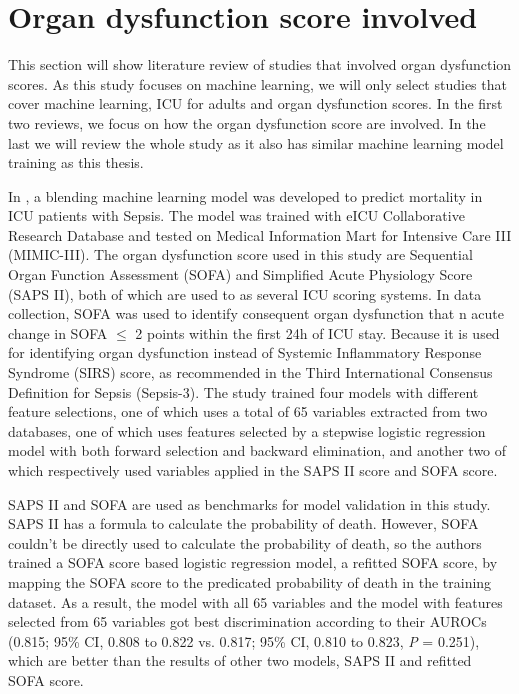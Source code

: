 \documentclass[12pt,a4paper,english
]{tunithesis}
\begin{document}
\section{Organ dysfunction score involved}
This section will show literature review of studies that involved organ dysfunction scores. As this study focuses on machine learning, we will only select studies that cover machine learning, ICU for adults and organ dysfunction scores. In the first two reviews, we focus on how the organ dysfunction score are involved. In the last we will review the whole study as it also has similar machine learning model training as this thesis.

In \textcite{zeng2021}, a blending machine learning model was developed to predict mortality in ICU patients with Sepsis. The model was trained with eICU Collaborative Research Database and tested on Medical Information Mart for Intensive Care III (MIMIC-III). The organ dysfunction score used in this study are Sequential Organ Function Assessment (SOFA) and Simplified Acute Physiology Score (SAPS II), both of which are used to as several ICU scoring systems. In data collection, SOFA was used to identify consequent organ dysfunction that n acute change in SOFA $\leq$ 2 points within the first 24h of ICU stay. Because it is used for identifying organ dysfunction instead of Systemic Inflammatory Response Syndrome (SIRS) score, as recommended in the Third International Consensus Definition for Sepsis (Sepsis-3). The study trained four models with different feature selections, one of which uses a total of 65 variables extracted from two databases, one of which uses features selected by a stepwise logistic regression model with both forward selection and backward elimination, and another two of which respectively used variables applied in the SAPS II score and SOFA score. 

SAPS II and SOFA are used as benchmarks for model validation in this study. SAPS II has a formula to calculate the probability of death. However, SOFA couldn't be directly used to calculate the probability of death, so the authors trained a SOFA score based logistic regression model, a refitted SOFA score, by mapping the SOFA score to the predicated probability of death in the training dataset. As a result, the model with all 65 variables and the model with features selected from 65 variables got best discrimination according to their AUROCs (0.815; 95\% CI, 0.808 to 0.822 vs. 0.817; 95\% CI, 0.810 to 0.823, \textit{P} = 0.251), which are better than the results of other two models, SAPS II and refitted SOFA score.
\end{document}
